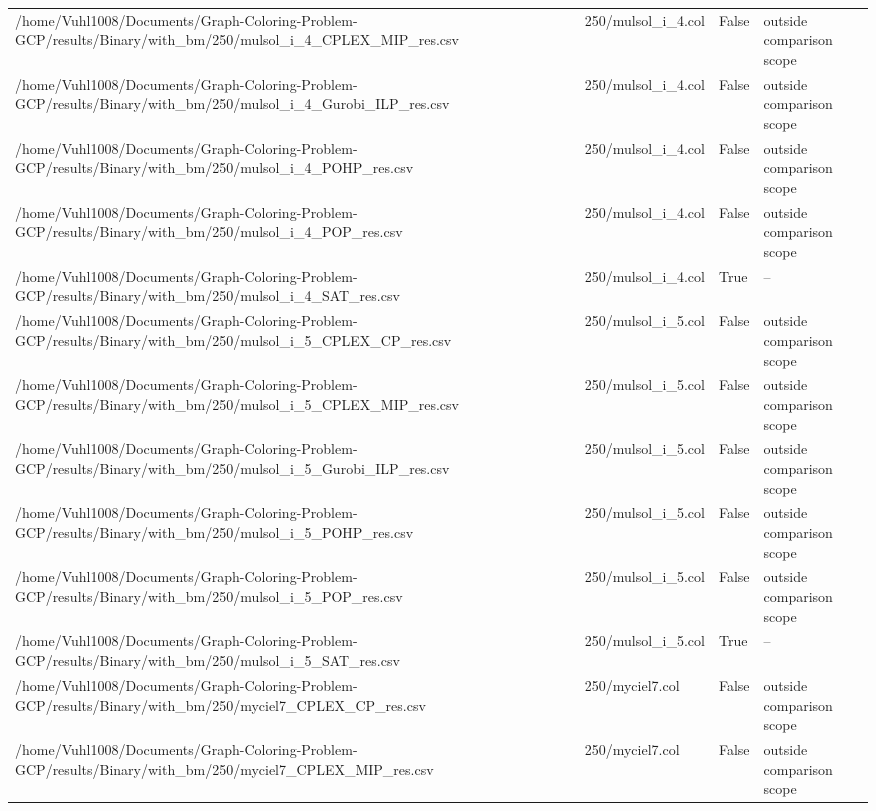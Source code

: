 \begin{table}[htbp]
\begin{tabular}{llll}
/home/Vuhl1008/Documents/Graph-Coloring-Problem-GCP/results/Binary/with\_bm/250/mulsol\_i\_4\_CPLEX\_MIP\_res.csv & 250/mulsol\_i\_4.col & False & outside comparison scope \\
/home/Vuhl1008/Documents/Graph-Coloring-Problem-GCP/results/Binary/with\_bm/250/mulsol\_i\_4\_Gurobi\_ILP\_res.csv & 250/mulsol\_i\_4.col & False & outside comparison scope \\
/home/Vuhl1008/Documents/Graph-Coloring-Problem-GCP/results/Binary/with\_bm/250/mulsol\_i\_4\_POHP\_res.csv & 250/mulsol\_i\_4.col & False & outside comparison scope \\
/home/Vuhl1008/Documents/Graph-Coloring-Problem-GCP/results/Binary/with\_bm/250/mulsol\_i\_4\_POP\_res.csv & 250/mulsol\_i\_4.col & False & outside comparison scope \\
/home/Vuhl1008/Documents/Graph-Coloring-Problem-GCP/results/Binary/with\_bm/250/mulsol\_i\_4\_SAT\_res.csv & 250/mulsol\_i\_4.col & True & -- \\
/home/Vuhl1008/Documents/Graph-Coloring-Problem-GCP/results/Binary/with\_bm/250/mulsol\_i\_5\_CPLEX\_CP\_res.csv & 250/mulsol\_i\_5.col & False & outside comparison scope \\
/home/Vuhl1008/Documents/Graph-Coloring-Problem-GCP/results/Binary/with\_bm/250/mulsol\_i\_5\_CPLEX\_MIP\_res.csv & 250/mulsol\_i\_5.col & False & outside comparison scope \\
/home/Vuhl1008/Documents/Graph-Coloring-Problem-GCP/results/Binary/with\_bm/250/mulsol\_i\_5\_Gurobi\_ILP\_res.csv & 250/mulsol\_i\_5.col & False & outside comparison scope \\
/home/Vuhl1008/Documents/Graph-Coloring-Problem-GCP/results/Binary/with\_bm/250/mulsol\_i\_5\_POHP\_res.csv & 250/mulsol\_i\_5.col & False & outside comparison scope \\
/home/Vuhl1008/Documents/Graph-Coloring-Problem-GCP/results/Binary/with\_bm/250/mulsol\_i\_5\_POP\_res.csv & 250/mulsol\_i\_5.col & False & outside comparison scope \\
/home/Vuhl1008/Documents/Graph-Coloring-Problem-GCP/results/Binary/with\_bm/250/mulsol\_i\_5\_SAT\_res.csv & 250/mulsol\_i\_5.col & True & -- \\
/home/Vuhl1008/Documents/Graph-Coloring-Problem-GCP/results/Binary/with\_bm/250/myciel7\_CPLEX\_CP\_res.csv & 250/myciel7.col & False & outside comparison scope \\
/home/Vuhl1008/Documents/Graph-Coloring-Problem-GCP/results/Binary/with\_bm/250/myciel7\_CPLEX\_MIP\_res.csv & 250/myciel7.col & False & outside comparison scope \\

\end{tabular}
\end{table}
